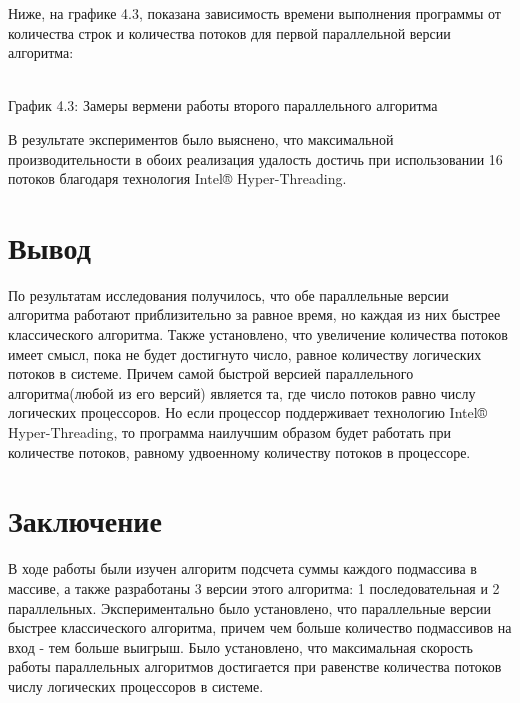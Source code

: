 \documentclass[12pt,a4paper]{article}
\numberwithin{equation}{section}
\begin{document}
Ниже, на графике 4.3, показана зависимость времени выполнения программы от количества строк и количества потоков для первой параллельной версии алгоритма:\\


\begin{center}
	\\
	График 4.3: Замеры вермени работы второго параллельного алгоритма\\
\end{center}
В результате экспериментов было выяснено, что максимальной производительности в обоих реализация удалость достичь при использовании 16 потоков благодаря технология Intel® Hyper-Threading.\\

\section*{Вывод}
По результатам исследования получилось, что обе параллельные версии алгоритма
работают приблизительно за равное время, но каждая из них быстрее классического алгоритма. Также установлено, что увеличение количества потоков имеет смысл, пока не будет достигнуто число, равное количеству логических потоков в системе. Причем самой быстрой версией параллельного алгоритма(любой из его версий) является та, где число потоков равно числу логических процессоров.
Но если процессор поддерживает технологию Intel® Hyper-Threading, то программа наилучшим образом будет работать при количестве потоков, равному удвоенному количеству потоков в процессоре.
\clearpage

\section*{\Huge Заключение}
\qquad В ходе работы были изучен алгоритм подсчета суммы каждого подмассива в массиве, а также разработаны 3 версии этого алгоритма: 1 последовательная и 2 параллельных. Экспериментально было установлено, что параллельные версии быстрее классического алгоритма, причем чем больше количество подмассивов на вход - тем больше выигрыш. Было
установлено, что максимальная скорость работы параллельных алгоритмов достигается при равенстве количества потоков числу логических процессоров в системе.
\end{document}
